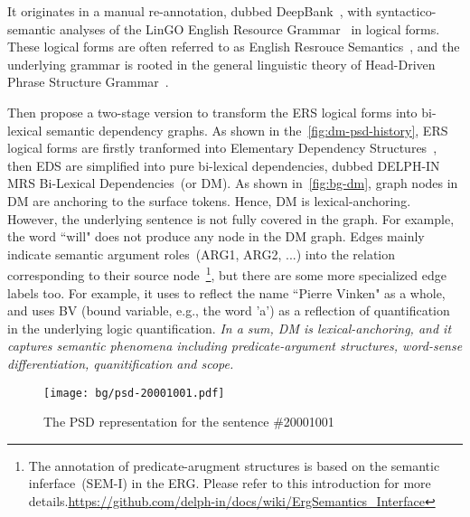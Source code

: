  It
originates in a manual re-annotation, dubbed
DeepBank~\citep{Fli:Kor:Zha:12}, with syntactico-semantic analyses of
the LinGO English Resource Grammar~\citep{Oep:Fli:Tou:04} in logical
forms. These logical forms are often referred to as English Resrouce
Semantics~\citep[ERS,][]{Ben:Fli:Oep:15}, and the underlying grammar
is rooted in the general linguistic theory of Head-Driven Phrase
Structure Grammar~\citep[HPSG,][]{Pol:Sag:94}.

Then \citet{Iva:Oep:Ovr:12} propose a two-stage version to transform
the ERS logical forms into bi-lexical semantic dependency graphs. As
shown in the~\autoref{fig:dm-psd-history}, ERS logical forms are
firstly tranformed into Elementary Dependency
Structures~\cite[EDS,][]{Oep:Lon:06}, then EDS are simplified into
pure bi-lexical dependencies, dubbed DELPH-IN MRS Bi-Lexical
Dependencies~(or DM). As shown in~\autoref{fig:bg-dm}, graph nodes in
DM are anchoring to the surface tokens. Hence, DM is
lexical-anchoring. However, the underlying sentence is not fully
covered in the graph. For example, the word ``will" does not produce
any node in the DM graph. Edges mainly indicate semantic argument
roles~(ARG1, ARG2, ...) into the relation corresponding to their
source node~\footnote{The annotation of predicate-arugment structures
  is based on the semantic inferface~(SEM-I) in the ERG. Please refer
  to this introduction for more
  details.\url{https://github.com/delph-in/docs/wiki/ErgSemantics_Interface}},
but there are some more specialized edge labels too. For example, it
uses  to reflect the name ``Pierre Vinken" as a whole,
and uses BV (bound variable, e.g., the word 'a') as a reflection of
quantification in the underlying logic quantification. \textit{In a sum, DM is
lexical-anchoring, and it captures semantic phenomena including
predicate-argument structures, word-sense differentiation,
quanitification and scope.}

\begin{figure}[!th]
\centering
\texttt{[image: bg/psd-20001001.pdf]}
\caption{\label{fig:bg-psd}The PSD representation for the sentence
  \#20001001}
\end{figure}


